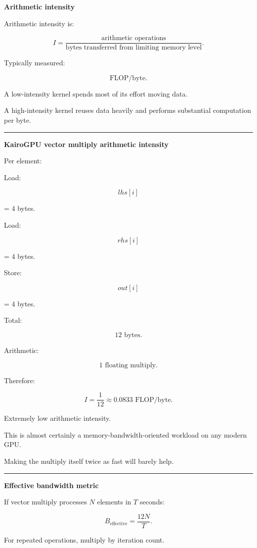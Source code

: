\textbf{Arithmetic intensity}

Arithmetic intensity is:

\[
\boxed{
I=
\frac{
\text{arithmetic operations}
}{
\text{bytes transferred from limiting memory level}
}.
}
\]

Typically measured:

\[
\text{FLOP/byte}.
\]

A low-intensity kernel spends most of its effort moving data.

A high-intensity kernel reuses data heavily and performs substantial computation per byte.

\begin{center}\rule{0.5\linewidth}{0.5pt}\end{center}

\textbf{KairoGPU vector multiply arithmetic intensity}

Per element:

Load:

\[
lhs[i]
\]

= 4 bytes.

Load:

\[
rhs[i]
\]

= 4 bytes.

Store:

\[
out[i]
\]

= 4 bytes.

Total:

\[
12\text{ bytes}.
\]

Arithmetic:

\[
1\text{ floating multiply}.
\]

Therefore:

\[
\boxed{
I=
\frac1{12}
\approx0.0833
\text{ FLOP/byte}.
}
\]

Extremely low arithmetic intensity.

This is almost certainly a memory-bandwidth-oriented workload on any modern GPU.

Making the multiply itself twice as fast will barely help.

\begin{center}\rule{0.5\linewidth}{0.5pt}\end{center}

\textbf{Effective bandwidth metric}

If vector multiply processes \(N\) elements in \(T\) seconds:

\[
\boxed{
B_{\text{effective}}
=
\frac{
12N
}{
T
}.
}
\]

For repeated operations, multiply by iteration count.

